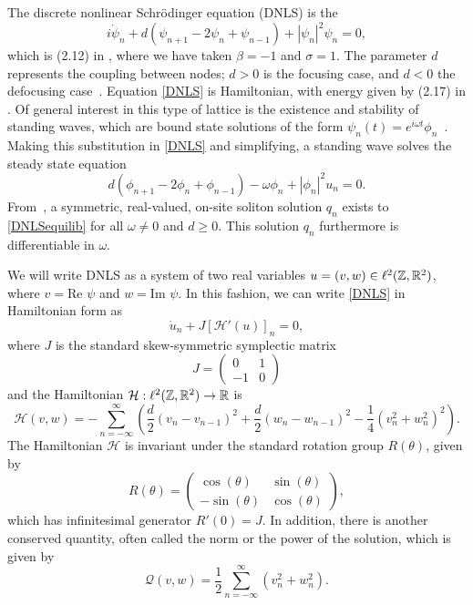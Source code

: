 \documentclass[thesis.tex]{subfiles}
\begin{document}
The discrete nonlinear Schr{\"o}dinger equation (DNLS) is the 
\begin{equation}\label{DNLS}
i\dot{\psi}_n + d(\psi_{n+1} - 2 \psi_n + \psi_{n-1}) + |\psi_n|^2 \psi_n = 0,
\end{equation}
which is (2.12) in \cite{Kevrekidis2009}, where we have taken $\beta = -1$ and $\sigma = 1$. The parameter $d$ represents the coupling between nodes; $d > 0$ is the focusing case, and $d < 0$ the defocusing case~\cite{Kevrekidis2009}. Equation \cref{DNLS} is Hamiltonian, with energy given by (2.17) in \cite{Kevrekidis2009,pelinovsky_2011}. Of general interest in this type of lattice is the existence and stability of standing waves, which are bound state solutions of the form $\psi_n(t) = e^{i \omega t}\phi_n$~\cite{alfimov}. Making this substitution in \cref{DNLS} and simplifying, a standing wave solves the steady state equation
\begin{equation}\label{DNLSequilib}
d(\phi_{n+1} - 2 \phi_n + \phi_{n-1}) - \omega \phi_n + |\phi_n|^2 u_n = 0.
\end{equation}
From~\cite{herrmann_2011}, a symmetric, real-valued, on-site soliton solution $q_n$ exists to \cref{DNLSequilib} for all $\omega \neq 0$ and $d \geq 0$. This solution $q_n$ furthermore is differentiable in $\omega$. 

We will write DNLS as a system of two real variables $u = (v, w) \in \ell^2(\mathbb{Z}, \mathbb{R}^2)$, where $v = \text{Re }\psi$ and $w = \text{Im }\psi$. In this fashion, we can write \cref{DNLS} in Hamiltonian form as
\begin{equation}\label{DNLSrealHam}
\dot{u}_n + J [\mathcal{H}'(u)]_n = 0,
\end{equation}
where $J$ is the standard skew-symmetric symplectic matrix
\[
J = \begin{pmatrix}0 & 1 \\ -1 & 0\end{pmatrix}
\]
and the Hamiltonian $\mathcal{H}: \ell^2(\mathbb{Z},\mathbb{R}^2) \rightarrow \mathbb{R}$ is
\begin{equation}\label{DNLSrealH}
\mathcal{H}(v, w) = -\sum_{n = -\infty}^\infty 
\left( \frac{d}{2}\left(v_n - v_{n-1}\right)^2 + \frac{d}{2}\left(w_n - w_{n-1}\right)^2 - \frac{1}{4}\left( v_n^2 + w_n^2 \right)^2 \right).
\end{equation}
The Hamiltonian $\mathcal{H}$ is invariant under the standard rotation group $R(\theta)$, given by
\begin{equation}\label{Rtheta}
R(\theta) = \begin{pmatrix}
 \cos(\theta) & \sin(\theta) \\
-\sin(\theta) & \cos(\theta)
\end{pmatrix},
\end{equation}
which has infinitesimal generator $R'(0) = J$. In addition, there is another conserved quantity, often called the norm or the power of the solution, which is given by
\begin{equation}\label{DNLSQ}
\mathcal{Q}(v, w) = \frac{1}{2} \sum_{n = -\infty}^\infty 
\left( v_n^2 + w_n ^2\right).
\end{equation}
\end{document}
